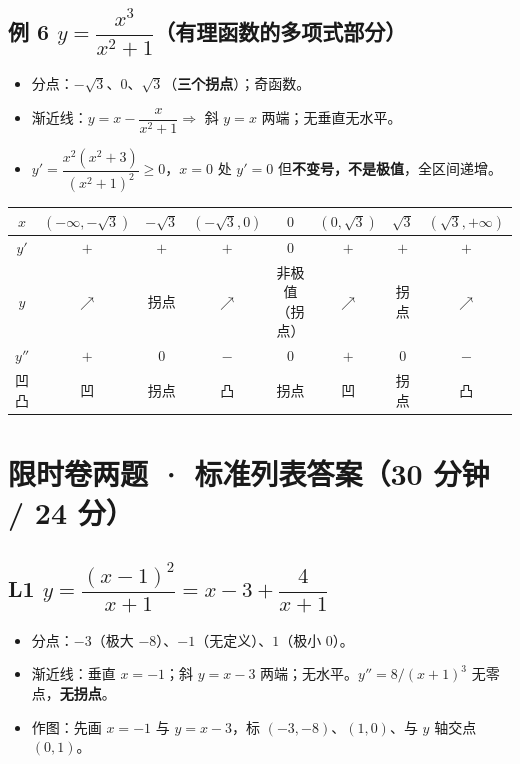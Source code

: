\documentclass[11pt,a4paper]{ctexart}
\begin{document}
\subsection{例 6 $y=\dfrac{x^3}{x^2+1}$（有理函数的多项式部分）}

\begin{itemize}[label=$\bullet$,leftmargin=1.5em]
\item 分点：$-\sqrt3$、$0$、$\sqrt3$（\textbf{三个拐点}）；奇函数。
\item 渐近线：$y=x-\dfrac{x}{x^2+1}\Rightarrow$ 斜 $y=x$ 两端；无垂直无水平。
\item $y'=\dfrac{x^2(x^2+3)}{(x^2+1)^2}\ge0$，$x=0$ 处 $y'=0$ 但\textbf{不变号，不是极值}，全区间递增。
\end{itemize}

\begin{center}
\footnotesize\setlength{\tabcolsep}{1.5pt}
\begin{tabular}{@{}c|ccccccc@{}}
$x$ & $(-\infty,-\sqrt3)$ & $-\sqrt3$ & $(-\sqrt3,0)$ & $0$ & $(0,\sqrt3)$ & $\sqrt3$ & $(\sqrt3,+\infty)$ \\
\hline
$y'$ & $+$ & $+$ & $+$ & $0$ & $+$ & $+$ & $+$ \\
$y$ & $\nearrow$ & 拐点 & $\nearrow$ & 非极值（拐点） & $\nearrow$ & 拐点 & $\nearrow$ \\
$y''$ & $+$ & $0$ & $-$ & $0$ & $+$ & $0$ & $-$ \\
凹凸 & 凹 & 拐点 & 凸 & 拐点 & 凹 & 拐点 & 凸 \\
\end{tabular}
\end{center}

\section{限时卷两题 · 标准列表答案（30 分钟 / 24 分）}

\subsection{L1 $y=\dfrac{(x-1)^2}{x+1}=x-3+\dfrac4{x+1}$}

\begin{itemize}[label=$\bullet$,leftmargin=1.5em]
\item 分点：$-3$（极大 $-8$）、$-1$（无定义）、$1$（极小 $0$）。
\item 渐近线：垂直 $x=-1$；斜 $y=x-3$ 两端；无水平。$y''=8/(x+1)^3$ 无零点，\textbf{无拐点}。
\item 作图：先画 $x=-1$ 与 $y=x-3$，标 $(-3,-8)$、$(1,0)$、与 $y$ 轴交点 $(0,1)$。
\end{itemize}
\end{document}
